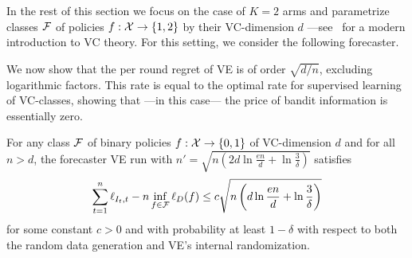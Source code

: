 In the rest of this section we focus on the case of $K=2$ arms and parametrize classes $\mathcal{F}$ of policies $f : \mathcal{X}\to\{1,2\}$ by their VC-dimension $d$ ---see~\cite{BBL05} for a modern introduction to VC theory. For this setting, we consider the following forecaster.
%
\begin{center}
\end{center}
%
We now show that the per round regret of VE is of order $\sqrt{d/n}$, excluding logarithmic factors. This rate is equal to the optimal rate for supervised learning of VC-classes, showing that ---in this case--- the price of bandit information is essentially zero.
%
\begin{theorem}
For any class $\mathcal{F}$ of binary policies $f : \mathcal{X}\to\{0,1\}$ of VC-dimension $d$ and for all $n > d$,
the forecaster VE run with $n' = \sqrt{n\left(2d\ln\frac{en}{d}+ \ln\frac{3}{\delta}\right)}$ satisfies
\begin{equation} \label{eq:vebound}
	\sum_{t=1}^n \ell_{I_t,t} - n\inf_{f\in\mathcal{F}}\ell_D(f) \leq c\sqrt{n\left(d\ln\frac{en}{d} + \ln\frac{3}{\delta}\right)}
\end{equation}
for some constant $c > 0$ and with probability at least $1-\delta$ with respect to both the random data generation and VE's internal randomization.
\end{theorem}
%
